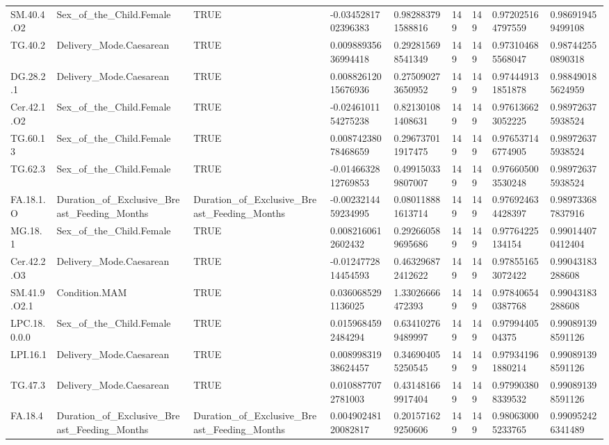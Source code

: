 \begin{longtable}{lllllllll}
SM.40.4.O2 & Sex\_of\_the\_Child.Female & TRUE & -0.0345281702396383 & 0.982883791588816 & 149 & 149 & 0.972025164797559 & 0.986919459499108 \\
TG.40.2 & Delivery\_Mode.Caesarean & TRUE & 0.00988935636994418 & 0.292815698541349 & 149 & 149 & 0.973104685568047 & 0.987442550890318 \\
DG.28.2.1 & Delivery\_Mode.Caesarean & TRUE & 0.00882612015676936 & 0.275090273650952 & 149 & 149 & 0.974449131851878 & 0.988490185624959 \\
Cer.42.1.O2 & Sex\_of\_the\_Child.Female & TRUE & -0.0246101154275238 & 0.821301081408631 & 149 & 149 & 0.976136623052225 & 0.989726375938524 \\
TG.60.13 & Sex\_of\_the\_Child.Female & TRUE & 0.00874238078468659 & 0.296737011917475 & 149 & 149 & 0.976537146774905 & 0.989726375938524 \\
TG.62.3 & Sex\_of\_the\_Child.Female & TRUE & -0.0146632812769853 & 0.499150339807007 & 149 & 149 & 0.976605003530248 & 0.989726375938524 \\
FA.18.1.O & Duration\_of\_Exclusive\_Breast\_Feeding\_Months & Duration\_of\_Exclusive\_Breast\_Feeding\_Months & -0.0023214459234995 & 0.080118881613714 & 149 & 149 & 0.976924634428397 & 0.989733687837916 \\
MG.18.1 & Sex\_of\_the\_Child.Female & TRUE & 0.0082160612602432 & 0.292660589695686 & 149 & 149 & 0.97764225134154 & 0.990144070412404 \\
Cer.42.2.O3 & Delivery\_Mode.Caesarean & TRUE & -0.0124772814454593 & 0.463296872412622 & 149 & 149 & 0.978551653072422 & 0.99043183288608 \\
SM.41.9.O2.1 & Condition.MAM & TRUE & 0.0360685291136025 & 1.33026666472393 & 149 & 149 & 0.978406540387768 & 0.99043183288608 \\
LPC.18.0.0.0 & Sex\_of\_the\_Child.Female & TRUE & 0.0159684592484294 & 0.634102769489997 & 149 & 149 & 0.9799440504375 & 0.990891398591126 \\
LPI.16.1 & Delivery\_Mode.Caesarean & TRUE & 0.00899831938624457 & 0.346904055250545 & 149 & 149 & 0.979341961880214 & 0.990891398591126 \\
TG.47.3 & Delivery\_Mode.Caesarean & TRUE & 0.0108877072781003 & 0.431481669917404 & 149 & 149 & 0.979903808339532 & 0.990891398591126 \\
FA.18.4 & Duration\_of\_Exclusive\_Breast\_Feeding\_Months & Duration\_of\_Exclusive\_Breast\_Feeding\_Months & 0.00490248120082817 & 0.201571629250606 & 149 & 149 & 0.980630005233765 & 0.990952426341489 \\

\end{longtable}
